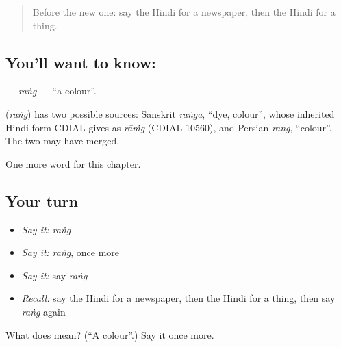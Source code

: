 \label{lesson:HI-C190-rang}



\begin{quote}
Before the new one: say the Hindi for a newspaper, then the Hindi for a thing.
\end{quote}

\subsection*{You'll want to know: }
\textbf{} — \emph{raṅg} — \textquotedblleft{}a colour\textquotedblright{}.

\begin{cousinweb}
\textbf{} (\emph{raṅg}) has two possible sources: Sanskrit \emph{raṅga}, \textquotedblleft{}dye, colour\textquotedblright{}, whose inherited Hindi form CDIAL gives as \emph{rāṁg} (CDIAL 10560), and Persian \emph{rang}, \textquotedblleft{}colour\textquotedblright{}. The two may have merged.
\end{cousinweb}

\begin{grammarlens}[title={What you've built}]
One more word for this chapter.
\end{grammarlens}

\subsection*{Your turn}
\begin{itemize}
\raggedright
  \item \emph{Say it:} \emph{raṅg}
  \item \emph{Say it:} \emph{raṅg}, once more
  \item \emph{Say it:} say \emph{raṅg}
  \item \emph{Recall:} say the Hindi for a newspaper, then the Hindi for a thing, then say \emph{raṅg} again
\end{itemize}

\begin{tcolorbox}[breakable,colback=teal!4,colframe=teal!35!black,title={Before you move on}]
What does  mean? (\textquotedblleft{}A colour\textquotedblright{}.) Say it once more.
\end{tcolorbox}
